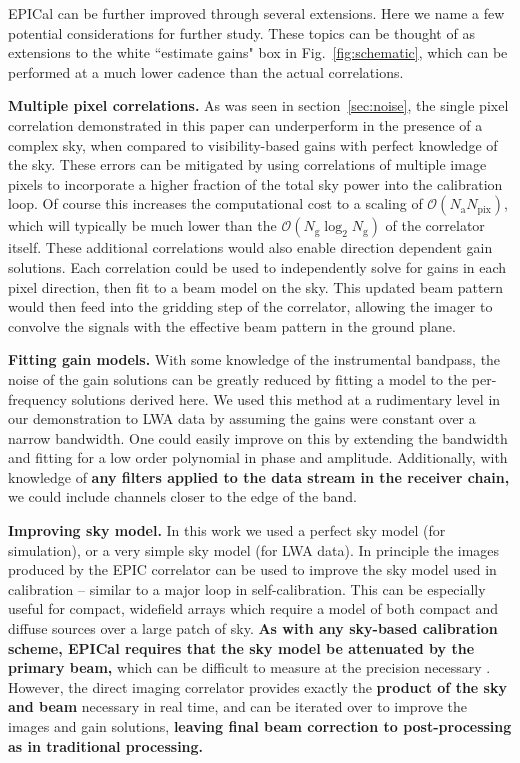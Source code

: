 \documentclass[a4paper,fleqn,usenatbib]{../mnras}
\newcommand{\Nant}{\ensuremath{N_{\mathrm{a}}}}
\newcommand{\Ng}{\ensuremath{N_{\mathrm{g}}}}
\begin{document}
EPICal can be further improved through several extensions. Here we name a few potential 
considerations for further study. These topics can be thought of as extensions to the white 
``estimate gains" box in Fig.~\ref{fig:schematic}, which can be performed at a much lower 
cadence than the actual correlations.

\textbf{Multiple pixel correlations.} As was seen in section~\ref{sec:noise}, the single pixel 
correlation demonstrated in this paper can underperform in the presence of a complex sky, 
when compared to visibility-based gains with perfect knowledge of the sky. These errors can be 
mitigated by using correlations of multiple image pixels to incorporate a higher fraction of the 
total sky power into the calibration loop. Of course this increases the computational cost to a 
scaling of $\mathcal{O}(\Nant N_{\mathrm{pix}})$, which will typically be much lower than the 
$\mathcal{O}(\Ng \log_2 \Ng)$ of the correlator itself. These additional correlations would also 
enable direction dependent gain solutions. Each correlation could be used to independently 
solve for gains in each pixel direction, then fit to a beam model on the sky. This updated beam 
pattern would then feed into the gridding step of the correlator, allowing the imager to convolve 
the signals with the effective beam pattern in the ground plane. 

\textbf{Fitting gain models.} With some knowledge of the instrumental bandpass, the noise of 
the gain solutions can be greatly reduced by fitting a model to the per-frequency solutions 
derived here. We used this method at a rudimentary level in our demonstration to LWA data by 
assuming the gains were constant over a narrow bandwidth. One could easily improve on this 
by extending the bandwidth and fitting for a low order polynomial in phase and amplitude. 
Additionally, with knowledge of 
\textbf{any filters applied to the data stream in the receiver chain,}
we could include channels closer to the edge of the band.

\textbf{Improving sky model.} In this work we used a perfect sky model (for simulation), or a 
very simple sky model (for LWA data). In principle the images produced by the EPIC correlator 
can be used to improve the sky model used in calibration -- similar to a major loop in 
self-calibration. This can be especially useful for compact, widefield arrays which require a model of 
both compact and diffuse sources over a large patch of sky. 
\textbf{As with any sky-based calibration scheme, EPICal requires that the sky model be attenuated
by the primary beam,} which 
can be difficult to measure at the precision necessary \citep[e.g.][]{neb15,vir14,thy15b}. 
However, the direct imaging correlator provides exactly the \textbf{product of the sky and beam} necessary in real time, and 
can be iterated over to improve the images and gain solutions, \textbf{leaving final beam
correction to post-processing as in traditional processing.}
\end{document}
